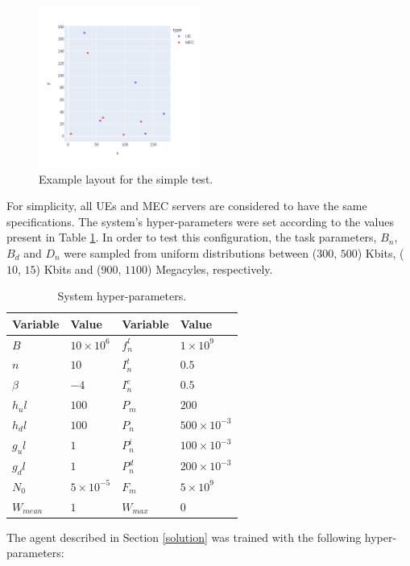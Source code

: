 \begin{figure}[H]
  \centering
  \includegraphics[width=200px]{images/example_layout.png}
  \caption{Example layout for the simple test.}  \label{example_layout}
\end{figure}

For simplicity, all \acrshort{UE}s and \acrshort{MEC} servers are considered to have the same specifications. The system's hyper-parameters were set according to the values present in Table \ref{hyperparams}. In order to test this configuration, the task parameters, $B_n$, $B_d$ and $D_n$ were sampled from uniform distributions between ($300$, $500$) Kbits, ($10$, $15$) Kbits and ($900$, $1100$) Megacyles, respectively. 

\begin{table}[H]
\centering
\begin{tabular}{|l|l|l|l|}
\hline
Variable             & Value & Variable                & Value \\ \hline
$B$&$10\times10^{6}$&$f_n^l$&$1\times10^{9}$\\
$n$&$10$&$I_n^t$&$0.5$\\
$\beta$&$-4$&$I_n^e$&$0.5$\\
$h_ul$&$100$& $P_m$&$200$\\
$h_dl$&$100$& $P_n$& $500\times10^{-3}$\\
$g_ul$&$1$&$P_n^i$&$100\times10^{-3}$\\
$g_dl$&$1$&$P_n^d$&$200\times10^{-3}$\\
$N_0$&$5\times10^{-5}$&$F_m$&$5\times10^{9}$\\
$W_{mean}$&$1$&$W_{max}$&$0$\\ \hline
\end{tabular}
\caption{System hyper-parameters.}\label{hyperparams}
\end{table}

The agent described in Section \ref{solution} was trained with the following hyper-parameters:


